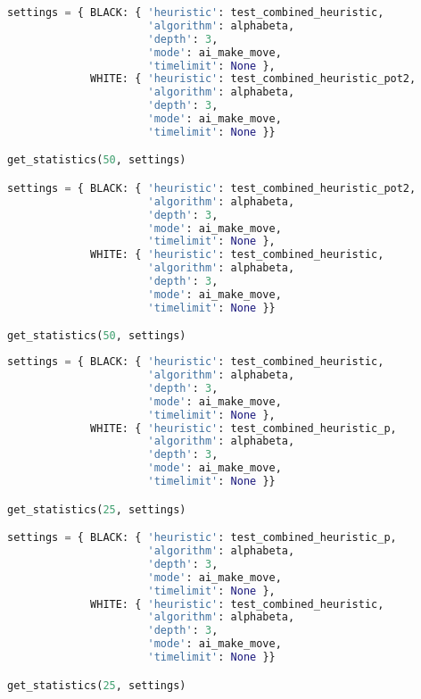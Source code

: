 \begin{lstlisting}[language=Python]
settings = { BLACK: { 'heuristic': test_combined_heuristic,
                      'algorithm': alphabeta,
                      'depth': 3,
                      'mode': ai_make_move,
                      'timelimit': None },
             WHITE: { 'heuristic': test_combined_heuristic_pot2,
                      'algorithm': alphabeta,
                      'depth': 3,
                      'mode': ai_make_move,
                      'timelimit': None }}

get_statistics(50, settings)

settings = { BLACK: { 'heuristic': test_combined_heuristic_pot2,
                      'algorithm': alphabeta,
                      'depth': 3,
                      'mode': ai_make_move,
                      'timelimit': None },
             WHITE: { 'heuristic': test_combined_heuristic,
                      'algorithm': alphabeta,
                      'depth': 3,
                      'mode': ai_make_move,
                      'timelimit': None }}

get_statistics(50, settings)
\end{lstlisting}

\begin{lstlisting}[language=Python]
settings = { BLACK: { 'heuristic': test_combined_heuristic,
                      'algorithm': alphabeta,
                      'depth': 3,
                      'mode': ai_make_move,
                      'timelimit': None },
             WHITE: { 'heuristic': test_combined_heuristic_p,
                      'algorithm': alphabeta,
                      'depth': 3,
                      'mode': ai_make_move,
                      'timelimit': None }}

get_statistics(25, settings)

settings = { BLACK: { 'heuristic': test_combined_heuristic_p,
                      'algorithm': alphabeta,
                      'depth': 3,
                      'mode': ai_make_move,
                      'timelimit': None },
             WHITE: { 'heuristic': test_combined_heuristic,
                      'algorithm': alphabeta,
                      'depth': 3,
                      'mode': ai_make_move,
                      'timelimit': None }}

get_statistics(25, settings)
\end{lstlisting}

